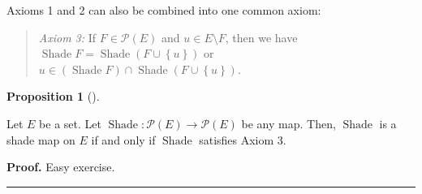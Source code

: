 \documentclass[numbers=enddot,12pt,final,onecolumn]{scrartcl}%
\newcounter{exer}
\theoremstyle{definition}
\newtheorem{prop}[theo]{Proposition}
\newenvironment{proposition}[1][]
{\begin{prop}[#1]\begin{leftbar}}
{\end{leftbar}\end{prop}}
\newenvironment{statement}{\begin{quote}}{\end{quote}}
\newenvironment{proof}[1][Proof]{\noindent\textbf{#1.} }{\ \rule{0.5em}{0.5em}}
\newenvironment{vershort}{}{}
\begin{document}
Axioms 1 and 2 can also be combined into one common axiom:

\begin{statement}
\textit{Axiom 3:} If $F\in\mathcal{P}\left(  E\right)  $ and $u\in E\setminus
F$, then we have $\operatorname*{Shade}F=\operatorname*{Shade}\left(
F\cup\left\{  u\right\}  \right)  $ or $u\in\left(  \operatorname*{Shade}%
F\right)  \cap\operatorname*{Shade}\left(  F\cup\left\{  u\right\}  \right)  $.
\end{statement}

\begin{proposition}
\label{prop.Shade.shade-3}Let $E$ be a set. Let $\operatorname*{Shade}%
:\mathcal{P}\left(  E\right)  \rightarrow\mathcal{P}\left(  E\right)  $ be any
map. Then, $\operatorname*{Shade}$ is a shade map on $E$ if and only if
$\operatorname*{Shade}$ satisfies Axiom 3.
\end{proposition}

\begin{vershort}
\begin{proof}
Easy exercise.
\end{proof}
\end{vershort}
\end{document}

